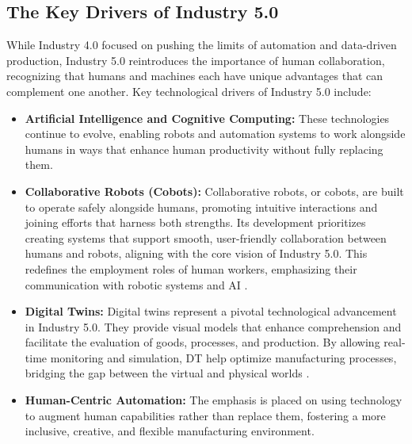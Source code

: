 \subsection{The Key Drivers of Industry 5.0}
While Industry 4.0 focused on pushing the limits of automation and data-driven production, Industry 5.0 reintroduces the importance of human collaboration,
recognizing that humans and machines each have unique advantages that can complement one another. Key technological drivers of Industry 5.0 include:
\begin{itemize} \item \textbf{Artificial Intelligence and Cognitive Computing:} These technologies continue to evolve, enabling robots and automation 
                systems to work alongside humans in ways that enhance human productivity without fully replacing them.
                
                \item \textbf{Collaborative Robots (Cobots):} Collaborative robots, or cobots, are built to operate safely alongside humans, promoting intuitive 
                interactions and joining efforts that harness both strengths. Its development prioritizes creating systems that support
                smooth, user-friendly collaboration between humans and robots, aligning with the core vision of Industry 5.0.
                This redefines the employment roles of human workers, emphasizing their communication with robotic systems 
                and \ac{AI} \cite{10577684}.

                \item \textbf{Digital Twins:} Digital twins represent a pivotal technological advancement in Industry 5.0. They provide visual models
                that enhance comprehension and facilitate the evaluation of goods, processes, and production. 
                By allowing real-time monitoring and simulation, \ac{DT} help optimize manufacturing processes, bridging the gap between the virtual 
                and physical worlds \cite{10577684}.

                \item \textbf{Human-Centric Automation:} The emphasis is placed on using technology to augment human capabilities rather than replace them,
                fostering a more inclusive, creative, and flexible manufacturing environment.
\end{itemize}

